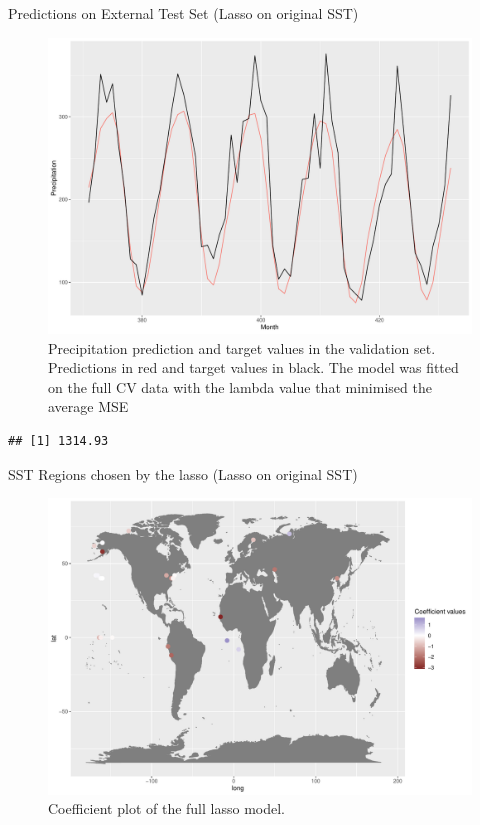 \documentclass[
  ignorenonframetext,
]{beamer}
\begin{document}
\begin{frame}[fragile]{Predictions on External Test Set (Lasso on
original SST)}
\protect\hypertarget{predictions-on-external-test-set-lasso-on-original-sst}{}
\begin{figure}

{\centering \includegraphics[width=0.75\linewidth]{ma-presentation_files/figure-beamer/pred-plot-full-lasso-og-1} 

}

\caption{Precipitation prediction and target values in the validation set. Predictions in red and target values in black. The model was fitted on the full CV data with the lambda value that minimised the average MSE}\label{fig:pred-plot-full-lasso-og}
\end{figure}

\begin{verbatim}
## [1] 1314.93
\end{verbatim}
\end{frame}

\begin{frame}{SST Regions chosen by the lasso (Lasso on original SST)}
\protect\hypertarget{sst-regions-chosen-by-the-lasso-lasso-on-original-sst}{}
\begin{figure}

{\centering \includegraphics[width=0.75\linewidth]{ma-presentation_files/figure-beamer/coef-plot-full-lasso-og-1} 

}

\caption{Coefficient plot of the full lasso model.}\label{fig:coef-plot-full-lasso-og}
\end{figure}
\end{frame}
\end{document}
